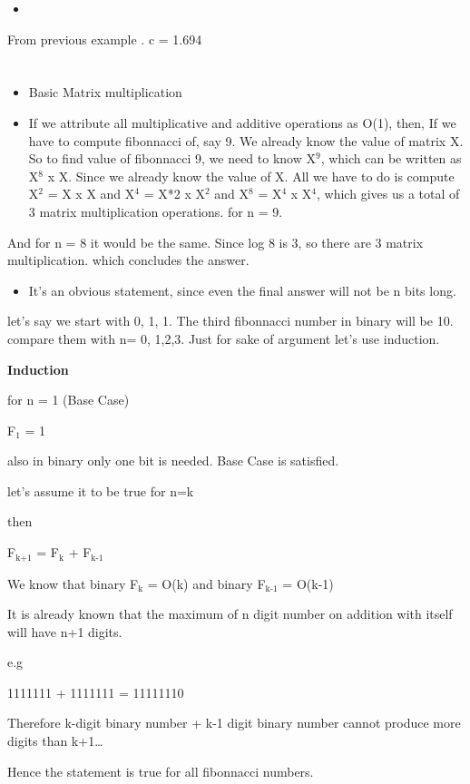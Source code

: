 \documentclass{book}
\begin{document}
\begin{itemize}
\item 
\end{itemize}
From previous example . c = 1.694

\section{}
\label{sec:orge952c97}
\begin{itemize}
\item Basic Matrix multiplication
\item If we attribute all multiplicative and additive operations as O(1), then,
If we have to compute fibonnacci of, say 9.
We already know the value of matrix X. So to find value of fibonnacci 9, we need to know X\(^{\text{9}}\), which can be written as X\(^{\text{8}}\) x X. Since we already know the value of X. All we have to do is compute X\(^{\text{2}}\) = X x X and X\(^{\text{4}}\) = X*2 x X\(^{\text{2}}\) and X\(^{\text{8}}\) = X\(^{\text{4}}\) x X\(^{\text{4}}\), which gives us a total of 3 matrix multiplication operations. for n = 9.
\end{itemize}
And for n = 8 it would be the same. Since log 8 is 3, so there are 3 matrix multiplication. which concludes the answer.
\begin{itemize}
\item It's an obvious statement, since even the final answer will not be n bits long.
\end{itemize}
let's say we start with 0, 1, 1. The third fibonnacci number in binary will be 10.  compare them with n= 0, 1,2,3. Just for sake of argument let's use induction.
\begin{EQUATION}
\textbf{Induction}

for n = 1 (Base Case)

F\(_{\text{1}}\) = 1

also in binary only one bit is needed. Base Case is satisfied.

let's assume it to be true for n=k

then 

F\(_{\text{k+1}}\) = F\(_{\text{k}}\) + F\(_{\text{k-1}}\)

We know that binary F\(_{\text{k}}\) = O(k) and binary F\(_{\text{k-1}}\) = O(k-1)

It is already known that the maximum of n digit number on addition with itself will have n+1 digits.

e.g

1111111 + 1111111 = 11111110

Therefore k-digit binary number + k-1 digit binary number cannot produce more digits than k+1\ldots{}

Hence the statement is true for all fibonnacci numbers.
\end{EQUATION}
\end{document}
